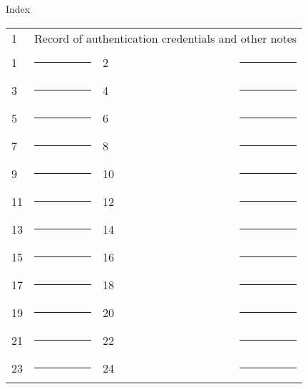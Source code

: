 \newpage
\thispagestyle{empty}

\begin{center}
{\large
Index \vspace{.5in}
}

\begin{tabular}{l l l l }
	1 & \multicolumn{3}{l}{Record of authentication credentials and other notes} \vspace{.225in} \\
	1 & \rule{1.75in}{.2pt} & 2 & \rule{1.75in}{.2pt} \vspace{.225in} \\
	3 & \rule{1.75in}{.2pt} & 4 & \rule{1.75in}{.2pt} \vspace{.225in} \\
	5 & \rule{1.75in}{.2pt} & 6 & \rule{1.75in}{.2pt} \vspace{.225in} \\
	7 & \rule{1.75in}{.2pt} & 8 & \rule{1.75in}{.2pt} \vspace{.225in} \\
	9 & \rule{1.75in}{.2pt} & 10 & \rule{1.75in}{.2pt} \vspace{.225in} \\
	11 & \rule{1.75in}{.2pt} & 12 & \rule{1.75in}{.2pt} \vspace{.225in} \\
	13 & \rule{1.75in}{.2pt} & 14 & \rule{1.75in}{.2pt} \vspace{.225in} \\
	15 & \rule{1.75in}{.2pt} & 16 & \rule{1.75in}{.2pt} \vspace{.225in} \\
	17 & \rule{1.75in}{.2pt} & 18 & \rule{1.75in}{.2pt} \vspace{.225in} \\
	19 & \rule{1.75in}{.2pt} & 20 & \rule{1.75in}{.2pt} \vspace{.225in} \\
	21 & \rule{1.75in}{.2pt} & 22 & \rule{1.75in}{.2pt} \vspace{.225in} \\
	23 & \rule{1.75in}{.2pt} & 24 & \rule{1.75in}{.2pt} \vspace{.225in} \\
\end{tabular}

\end{center}

\newpage
\thispagestyle{empty}

